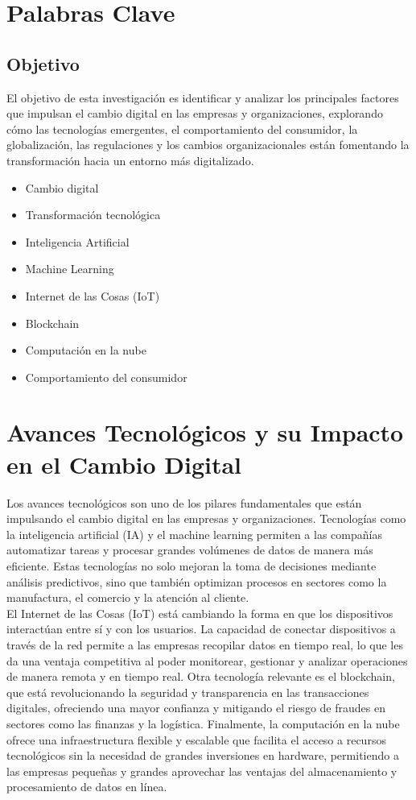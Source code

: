 \documentclass{article}
\begin{document}
\section{Palabras Clave}
\subsection{Objetivo}
El objetivo de esta investigación es identificar y analizar los principales factores que impulsan el cambio digital en las empresas y organizaciones, explorando cómo las tecnologías emergentes, el comportamiento del consumidor, la globalización, las regulaciones y los cambios organizacionales están fomentando la transformación hacia un entorno más digitalizado.
\begin{itemize}
    \item Cambio digital
    \item Transformación tecnológica
    \item Inteligencia Artificial
    \item Machine Learning
    \item Internet de las Cosas (IoT)
    \item Blockchain
    \item Computación en la nube
    \item Comportamiento del consumidor
\end{itemize}

\section{Avances Tecnológicos y su Impacto en el Cambio Digital}
\onehalfspacing
Los avances tecnológicos son uno de los pilares fundamentales que están impulsando el cambio digital en las empresas y organizaciones. Tecnologías como la inteligencia artificial (IA) y el machine learning permiten a las compañías automatizar tareas y procesar grandes volúmenes de datos de manera más eficiente. Estas tecnologías no solo mejoran la toma de decisiones mediante análisis predictivos, sino que también optimizan procesos en sectores como la manufactura, el comercio y la atención al cliente.\\

El Internet de las Cosas (IoT) está cambiando la forma en que los dispositivos interactúan entre sí y con los usuarios. La capacidad de conectar dispositivos a través de la red permite a las empresas recopilar datos en tiempo real, lo que les da una ventaja competitiva al poder monitorear, gestionar y analizar operaciones de manera remota y en tiempo real. Otra tecnología relevante es el blockchain, que está revolucionando la seguridad y transparencia en las transacciones digitales, ofreciendo una mayor confianza y mitigando el riesgo de fraudes en sectores como las finanzas y la logística. Finalmente, la computación en la nube ofrece una infraestructura flexible y escalable que facilita el acceso a recursos tecnológicos sin la necesidad de grandes inversiones en hardware, permitiendo a las empresas pequeñas y grandes aprovechar las ventajas del almacenamiento y procesamiento de datos en línea.\\
\end{document}

